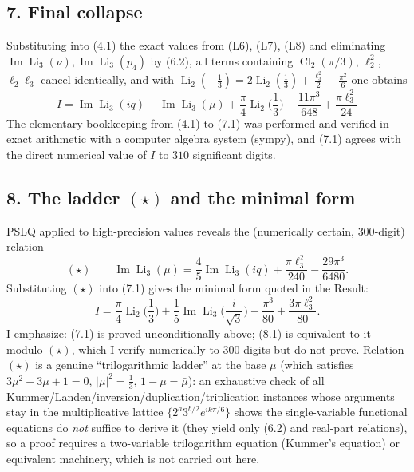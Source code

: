 \documentclass[11pt]{article}
\theoremstyle{remark}
\begin{document}
\subsection*{7. Final collapse}

Substituting into (4.1) the exact values from (L6), (L7), (L8) and eliminating
$\operatorname{Im}\operatorname{Li}_3(\nu),\operatorname{Im}\operatorname{Li}_3(p_4)$ by (6.2), all terms containing
$\operatorname{Cl}_2(\pi/3)$, $\ell_2^2$, $\ell_2\ell_3$ cancel identically, and with
$\operatorname{Li}_2(-\tfrac13)=2\operatorname{Li}_2(\tfrac13)+\tfrac{\ell_3^2}2-\tfrac{\pi^2}6$ one obtains
\begin{equation*}
\boxed{\;I=\operatorname{Im}\operatorname{Li}_3(iq)-\operatorname{Im}\operatorname{Li}_3(\mu)
+\frac\pi4\operatorname{Li}_2\!\Big(\frac13\Big)-\frac{11\pi^3}{648}+\frac{\pi\ell_3^2}{24}\;}\tag{7.1}
\end{equation*}
The elementary bookkeeping from (4.1) to (7.1) was performed and verified in exact arithmetic with a computer algebra system (sympy), and (7.1) agrees with the direct numerical value of $I$ to $310$ significant digits.

\subsection*{8. The ladder $(\star)$ and the minimal form}

PSLQ applied to high-precision values reveals the (numerically certain, $300$-digit) relation
\[
(\star)\qquad
\operatorname{Im}\operatorname{Li}_3(\mu)=\frac45\operatorname{Im}\operatorname{Li}_3(iq)+\frac{\pi\ell_3^2}{240}-\frac{29\pi^3}{6480}.
\]
Substituting $(\star)$ into (7.1) gives the minimal form quoted in the Result:
\begin{equation*}
I=\frac{\pi}{4}\operatorname{Li}_2\!\Big(\frac13\Big)
+\frac15\operatorname{Im}\operatorname{Li}_3\!\Big(\frac{i}{\sqrt3}\Big)
-\frac{\pi^3}{80}+\frac{3\pi\ell_3^2}{80}. \tag{8.1}
\end{equation*}
I emphasize: (7.1) is proved unconditionally above; (8.1) is equivalent to it modulo $(\star)$, which I verify numerically to $300$ digits but do not prove. Relation $(\star)$ is a genuine ``trilogarithmic ladder'' at the base $\mu$ (which satisfies $3\mu^2-3\mu+1=0$, $|\mu|^2=\tfrac13$, $1-\mu=\bar\mu$): an exhaustive check of all Kummer/Landen/inversion/duplication/triplication instances whose arguments stay in the multiplicative lattice $\{2^a3^{b/2}e^{ik\pi/6}\}$ shows the single-variable functional equations do \textit{not} suffice to derive it (they yield only (6.2) and real-part relations), so a proof requires a two-variable trilogarithm equation (Kummer's equation) or equivalent machinery, which is not carried out here.
\end{document}
